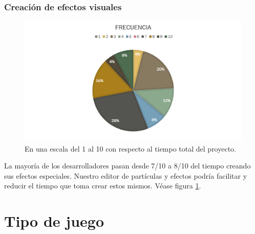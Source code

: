 \documentclass[]{article}
\begin{document}
\subsubsection{Creaci\'on de efectos visuales}
\begin{figure}[H]
	
	\centering
	\includegraphics[width=1\textwidth]{Encuesta_tiempo_efectos}
	\caption{En una escala del 1 al 10 con respecto al tiempo total del proyecto.} 
	\label{EFECTOS}
	
\end{figure}
La mayor\'ia de los desarrolladores pasan desde 7/10 a 8/10 del tiempo creando sus efectos especiales. Nuestro editor de part\'iculas y efectos podr\'ia facilitar y reducir el tiempo que toma crear estos mismos. V\'ease figura \ref{EFECTOS}.

\section{Tipo de juego}
\end{document}
